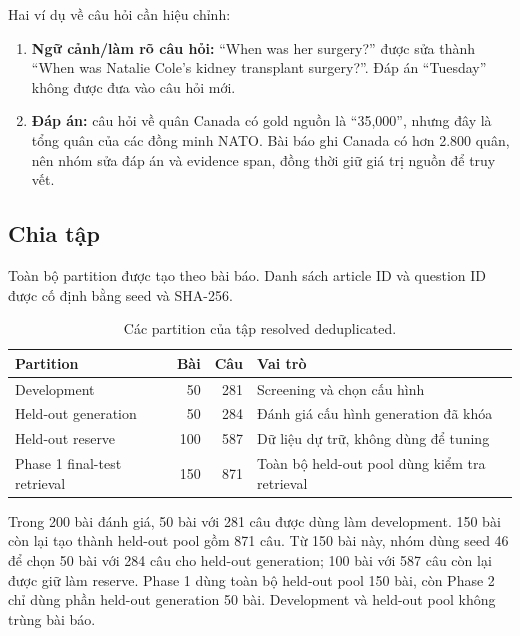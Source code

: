 Hai ví dụ về câu hỏi cần hiệu chỉnh:

\begin{enumerate}
  \item \textbf{Ngữ cảnh/làm rõ câu hỏi:} ``When was her surgery?'' được sửa
  thành ``When was Natalie Cole's kidney transplant surgery?''. Đáp án
  ``Tuesday'' không được đưa vào câu hỏi mới.
  \item \textbf{Đáp án:} câu hỏi về quân Canada có gold nguồn là ``35,000'',
  nhưng đây là tổng quân của các đồng minh NATO. Bài báo ghi Canada có hơn
  2.800 quân, nên nhóm sửa đáp án và evidence span, đồng thời giữ giá trị nguồn
  để truy vết.
\end{enumerate}

\subsection{Chia tập}

Toàn bộ partition được tạo theo bài báo. Danh sách article ID và question ID
được cố định bằng seed và SHA-256.

\begin{table}[htbp]
  \centering
  \caption{Các partition của tập resolved deduplicated.}
  \label{tab:evaluation-partitions}
  \begin{tabularx}{\textwidth}{@{}XrrX@{}}
    \toprule
    \textbf{Partition} & \textbf{Bài} & \textbf{Câu} & \textbf{Vai trò} \\
    \midrule
    Development & 50 & 281 & Screening và chọn cấu hình \\
    Held-out generation & 50 & 284 & Đánh giá cấu hình generation đã khóa \\
    Held-out reserve & 100 & 587 & Dữ liệu dự trữ, không dùng để tuning \\
    Phase 1 final-test retrieval & 150 & 871 & Toàn bộ held-out pool dùng kiểm tra retrieval \\
    \bottomrule
  \end{tabularx}
\end{table}

Trong 200 bài đánh giá, 50 bài với 281 câu được dùng làm development. 150 bài
còn lại tạo thành held-out pool gồm 871 câu. Từ 150 bài này, nhóm dùng seed 46
để chọn 50 bài với 284 câu cho held-out generation; 100 bài với 587 câu còn lại
được giữ làm reserve. Phase 1 dùng toàn bộ held-out pool 150 bài, còn Phase 2
chỉ dùng phần held-out generation 50 bài. Development và held-out pool không
trùng bài báo.

